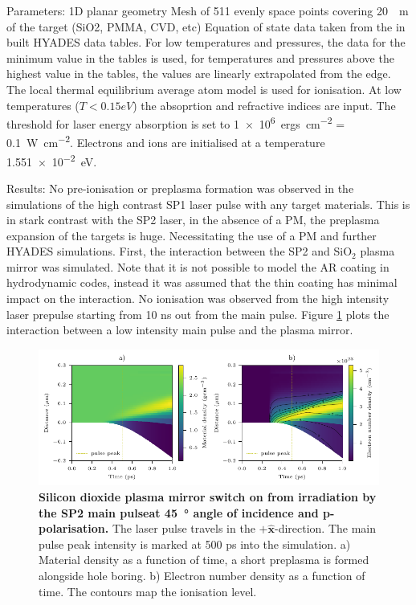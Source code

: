 Parameters:
1D planar geometry
Mesh of 511 evenly space points covering \qty{20}{\mu m} of the target (SiO2, PMMA, CVD, etc)
Equation of state data taken from the in built HYADES data tables. For low temperatures and pressures, the data for the minimum value in the tables is used, for temperatures and pressures above the highest value in the tables, the values are linearly extrapolated from the edge.
The local thermal equilibrium average atom model is used for ionisation. 
At low temperatures ($T < 0.15 eV$) the absoprtion and refractive indices are input.
The threshold for laser energy absorption is set to \qty{1e6}{ergs.cm^{-2}} = \qty{0.1}{W.cm^{-2}}.
Electrons and ions are initialised at a temperature \qty{1.551e-2}{eV}.




Results:
No pre-ionisation or preplasma formation was observed in the simulations of the high contrast SP1 laser pulse with any target materials. This is in stark contrast with the SP2 laser, in the absence of a PM, the preplasma expansion of the targets is huge. Necessitating the use of a PM and further HYADES simulations.
First, the interaction between the SP2 and SiO$_2$ plasma mirror was simulated. Note that it is not possible to model the AR coating in hydrodynamic codes, instead it was assumed that the thin coating has minimal impact on the interaction. No ionisation was observed from the high intensity laser prepulse starting from 10 ns out from the main pulse. Figure \ref{fig:orionpmirradiation} plots the interaction between a low intensity main pulse and the plasma mirror. 
\begin{figure}
	\centering
	\includegraphics{figures/orion/orion_PM_irradiation}
	\caption[Silicon dioxide plasma mirror switch on from irradiation by the SP2 main pulse.]{\textbf{Silicon dioxide plasma mirror switch on from irradiation by the SP2 main pulseat \qty{45}{\degree} angle of incidence and p-polarisation.} The laser pulse travels in the $+\mathbf{\hat{x}}$-direction. The main pulse peak intensity is marked at 500 ps into the simulation. a) Material density as a function of time, a short preplasma is formed alongside hole boring. b) Electron number density as a function of time. The contours map the ionisation level.}
	\label{fig:orionpmirradiation}
\end{figure}
